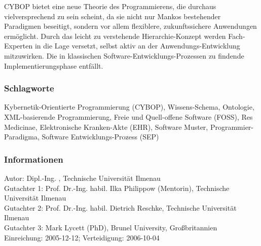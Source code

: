 CYBOP bietet eine neue Theorie des Programmierens, die durchaus vielversprechend
zu sein scheint, da sie nicht nur Mankos bestehender Paradigmen beseitigt,
sondern vor allem flexiblere, zukunftssichere Anwendungen erm\"oglicht. Durch
das leicht zu verstehende Hierarchie-Konzept werden Fach-Experten in die Lage
versetzt, selbst aktiv an der Anwendungs-Entwicklung mitzuwirken. Die in
klassischen Software-Entwicklungs-Prozessen zu findende Implementierungsphase
entf\"allt.

\subsubsection{Schlagworte}

Kybernetik-Orientierte Programmierung (CYBOP),
Wissens-Schema,
Ontologie,
XML-basierende Programmierung,
Freie und Quell-offene Software (FOSS),
Res Medicinae,
Elektronische Kranken-Akte (EHR),
Software Muster,
Programmier-Paradigma,
Software Entwicklungs-Prozess (SEP)

\subsubsection{Informationen}

Autor: Dipl.-Ing. \authormacro, Technische Universit\"at Ilmenau\\
Gutachter 1: Prof. Dr.-Ing. habil. Ilka Philippow (Mentorin), Technische Universit\"at Ilmenau\\
Gutachter 2: Prof. Dr.-Ing. habil. Dietrich Reschke, Technische Universit\"at Ilmenau\\
Gutachter 3: Mark Lycett (PhD), Brunel University, Gro\ss{}britannien\\
Einreichung: 2005-12-12; Verteidigung: 2006-10-04
